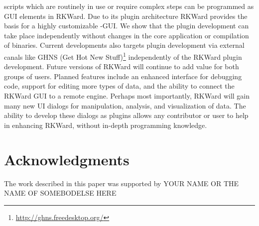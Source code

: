 scripts which are routinely in use or require complex steps can be programmed as GUI 
elements in RKWard. Due to its plugin architecture RKWard provides the basis 
for a highly customizable -GUI. We show that the plugin development can take place 
independently without changes in the core application or compilation of binaries. 
Current developments also targets plugin development via external canals like 
GHNS (Get Hot New Stuff)\footnote{\url{http://ghns.freedesktop.org/}} independently of the 
RKWard plugin development. 
Future versions of RKWard will continue to add value for both groups of users. Planned features include
an enhanced interface for debugging  code, support for editing more types of data, and the
ability to connect the RKWard GUI to a remote  engine. Perhaps most importantly, RKWard will
gain many new UI dialogs for manipulation, analysis, and visualization of data. The ability to
develop these dialogs as plugins allows any contributor or user to help in enhancing RKWard, without in-depth
programming knowledge.

\section{Acknowledgments}
\label{sec:acknowledgments}
The work described in this paper was supported by YOUR NAME OR THE NAME
OF SOMEBODELSE HERE
